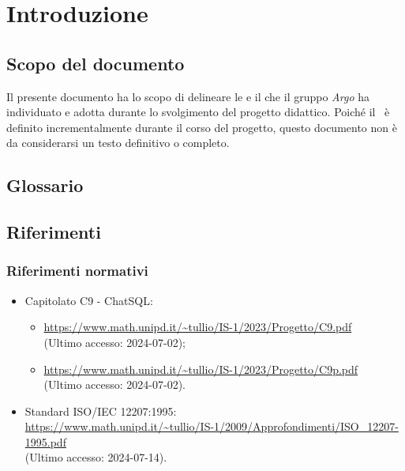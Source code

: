 \section{Introduzione}

\subsection{Scopo del documento}
\par Il presente documento ha lo scopo di delineare le  e il  che il gruppo \textit{Argo} ha individuato e adotta durante lo svolgimento del progetto didattico. Poiché il \Wow\ è definito incrementalmente durante il corso del progetto, questo documento non è da considerarsi un testo definitivo o completo.

\subsection{Glossario}
\GlossarioIntroduzione

\subsection{Riferimenti}

\subsubsection{Riferimenti normativi}
\begin{itemize}
  \item Capitolato C9 - ChatSQL:
  \begin{itemize}
    \item \href{https://www.math.unipd.it/~tullio/IS-1/2023/Progetto/C9.pdf}{https://www.math.unipd.it/\textasciitilde tullio/IS-1/2023/Progetto/C9.pdf} \\ (Ultimo accesso: 2024-07-02);
    \item \href{https://www.math.unipd.it/~tullio/IS-1/2023/Progetto/C9.pdf}{https://www.math.unipd.it/\textasciitilde tullio/IS-1/2023/Progetto/C9p.pdf} \\ (Ultimo accesso: 2024-07-02).
  \end{itemize}
  \item Standard ISO/IEC 12207:1995:\\ \url{https://www.math.unipd.it/~tullio/IS-1/2009/Approfondimenti/ISO_12207-1995.pdf} \\ (Ultimo accesso: 2024-07-14).
\end{itemize}

